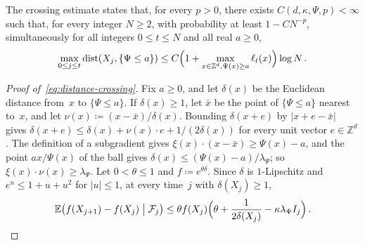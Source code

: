 \documentclass[11pt]{amsart}
\theoremstyle{plain}
\theoremstyle{definition}
\newcommand{\Z}{\mathbb Z}
\newcommand{\E}{\mathbb E}
\newcommand{\drift}{\kappa}
\newcommand{\gauge}{\Psi}
\numberwithin{equation}{section}
\begin{document}
The crossing estimate states that, for every $p>0$, there exists $C(d,\drift,\gauge,p)<\infty$ such that, for every integer $N\geq2$, with probability at least $1-CN^{-p}$, simultaneously for all integers $0\leq t\leq N$ and all real $a\geq0$,
\begin{equation}\label{eq:distance-crossing}
\max_{0\leq j\leq t}\operatorname{dist}(X_j,\{\gauge\leq a\})
\leq C\Bigl(1+\max_{x\in\Z^d,\gauge(x)\geq a}\ell_t(x)\Bigr)\log N\, .
\end{equation}
\begin{proof}[Proof of~\eqref{eq:distance-crossing}]
Fix $a\geq0$, and let $\delta(x)$ be the Euclidean distance from~$x$ to $\{\gauge\leq a\}$. If $\delta(x)\geq1$, let $\bar x$ be the point of $\{\gauge\leq a\}$ nearest to~$x$, and let $\nu(x)\coloneqq(x-\bar x)/\delta(x)$. Bounding $\delta(x+e)$ by $|x+e-\bar x|$ gives $\delta(x+e)\leq\delta(x)+\nu(x)\cdot e+1/(2\delta(x))$ for every unit vector $e\in\Z^d$. The definition of a subgradient gives $\xi(x)\cdot(x-\bar x)\geq\gauge(x)-a$, and the point $ax/\gauge(x)$ of the ball gives $\delta(x)\leq(\gauge(x)-a)/\lambda_\gauge$; so $\xi(x)\cdot\nu(x)\geq \lambda_\gauge$. Let $0<\theta\leq1$ and $f\coloneqq e^{\theta\delta}$. Since $\delta$ is $1$-Lipschitz and $e^u\leq1+u+u^2$ for $|u|\leq1$, at every time~$j$ with $\delta(X_j)\geq1$,
\begin{equation*}
\E\bigl(f(X_{j+1})-f(X_j)\bigm|\mathcal F_j\bigr)
\leq\theta f(X_j)\Bigl(\theta+\frac1{2\delta(X_j)}-\drift \lambda_\gauge I_j\Bigr)\, .
\end{equation*}


\end{proof}
\end{document}
